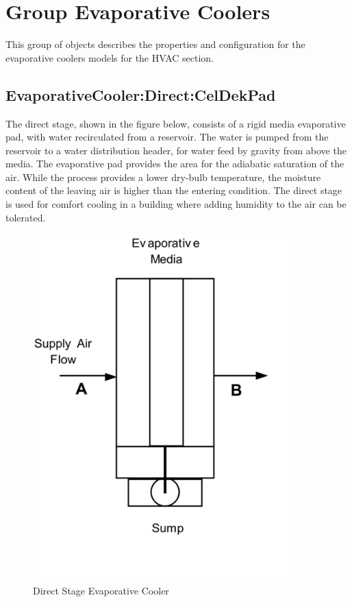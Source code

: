 \section{Group Evaporative Coolers}\label{group-evaporative-coolers}

This group of objects describes the properties and configuration for the evaporative coolers models for the HVAC section.

\subsection{EvaporativeCooler:Direct:CelDekPad}\label{evaporativecoolerdirectceldekpad}

The direct stage, shown in the figure below, consists of a rigid media evaporative pad, with water recirculated from a reservoir. The water is pumped from the reservoir to a water distribution header, for water feed by gravity from above the media. The evaporative pad provides the area for the adiabatic saturation of the air. While the process provides a lower dry-bulb temperature, the moisture content of the leaving air is higher than the entering condition. The direct stage is used for comfort cooling in a building where adding humidity to the air can be tolerated.

\begin{figure}[hbtp] %
\centering
\includegraphics[width=0.9\textwidth, height=0.9\textheight, keepaspectratio=true]{media/image415.png}
\caption{Direct Stage Evaporative Cooler \protect \label{fig:direct-stage-evaporative-cooler}}
\end{figure}

